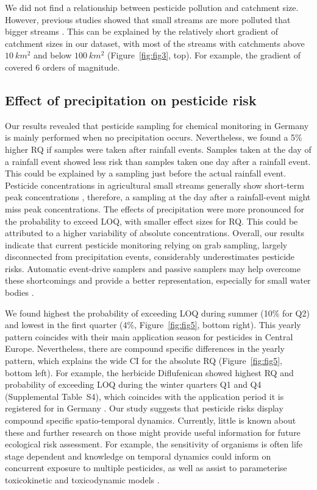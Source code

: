 \documentclass[journal=esthag,manuscript=article]{achemso}
\begin{document}
We did not find a relationship between pesticide pollution and catchment size.
However, previous studies showed that small streams are more polluted that bigger streams \citep{schulz_field_2004,stehle_pesticide_2015,knauer_pesticides_2016}.
This can be explained by the relatively short gradient of catchment sizes in our dataset, with most of the streams with catchments above $10~km^2$ and below $100~km^2$ (Figure~\ref{fig:fig3}, top).
For example, the gradient of \citet{schulz_field_2004} covered 6 orders of magnitude.


\subsection{Effect of precipitation on pesticide risk}
Our results revealed that pesticide sampling for chemical monitoring in Germany is mainly performed when no precipitation occurs. 
Nevertheless, we found a 5\% higher RQ if samples were taken after rainfall events. 
Samples taken at the day of a rainfall event showed less risk than samples taken one day after a rainfall event.
This could be explained by a sampling just before the actual rainfall event.
Pesticide concentrations in agricultural small streams generally show short-term peak concentrations \citep{wittmer_significance_2010}, therefore, a sampling at the day after a rainfall-event might miss peak concentrations.
The effects of precipitation were more pronounced for the probability to exceed LOQ, with smaller effect sizes for RQ.
This could be attributed to a higher variability of absolute concentrations.
Overall, our results indicate that current pesticide monitoring relying on grab sampling, largely disconnected from precipitation events, considerably underestimates pesticide risks.
Automatic event-drive samplers \citep{stehle_probabilistic_2013} and passive samplers \citep{fernandez_calibration_2014,moschet_evaluation_2015} may help overcome these shortcomings and provide a better representation, especially for small water bodies \citep{lorenz_specifics_2016}. 

We found highest the probability of exceeding LOQ during summer (10\% for Q2) and lowest in the first quarter (4\%, Figure~\ref{fig:fig5}, bottom right).
This yearly pattern coincides with their main application season for pesticides in Central Europe.
Nevertheless, there are compound specific differences in the yearly pattern, which explains the wide CI for the absolute RQ (Figure~\ref{fig:fig5}, bottom left).
For example, the herbicide Diflufenican showed highest RQ and probability of exceeding LOQ during the winter quarters Q1 and Q4 (Supplemental Table~S4), which coincides with the application period it is registered for in Germany \citep{bvl_online_2016}.
Our study suggests that pesticide risks display compound specific spatio-temporal dynamics.
Currently, little is known about these and further research on those might provide useful information for future ecological risk assessment. 
For example, the sensitivity of organisms is often life stage dependent \citep{hutchinson1998analysis} and knowledge on temporal dynamics could inform on concurrent exposure to multiple pesticides, as well as assist to parameterise toxicokinetic and toxicodynamic models \citep{ashauer2016modelling}. 
\end{document}
